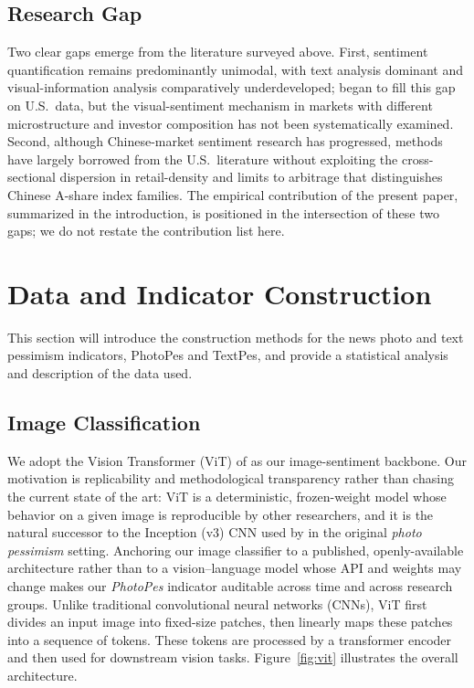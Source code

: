 \documentclass[AER]{AEA}
\begin{document}
\subsection{Research Gap}

Two clear gaps emerge from the literature surveyed above. First, sentiment quantification remains predominantly unimodal, with text analysis dominant and visual-information analysis comparatively underdeveloped; \citet{obaid2022picture} began to fill this gap on U.S.\ data, but the visual-sentiment mechanism in markets with different microstructure and investor composition has not been systematically examined. Second, although Chinese-market sentiment research has progressed, methods have largely borrowed from the U.S.\ literature without exploiting the cross-sectional dispersion in retail-density and limits to arbitrage that distinguishes Chinese A-share index families. The empirical contribution of the present paper, summarized in the introduction, is positioned in the intersection of these two gaps; we do not restate the contribution list here.



\section{Data and Indicator Construction}

This section will introduce the construction methods for the news photo and text pessimism indicators, PhotoPes and TextPes, and provide a statistical analysis and description of the data used.

\subsection{Image Classification}
We adopt the Vision Transformer (ViT) of \citet{dosovitskiy2020image} as our image-sentiment backbone. Our motivation is replicability and methodological transparency rather than chasing the current state of the art: ViT is a deterministic, frozen-weight model whose behavior on a given image is reproducible by other researchers, and it is the natural successor to the Inception (v3) CNN used by \citet{obaid2022picture} in the original \emph{photo pessimism} setting. Anchoring our image classifier to a published, openly-available architecture rather than to a vision--language model whose API and weights may change makes our \textit{PhotoPes} indicator auditable across time and across research groups. Unlike traditional convolutional neural networks (CNNs), ViT first divides an input image into fixed-size patches, then linearly maps these patches into a sequence of tokens. These tokens are processed by a transformer encoder and then used for downstream vision tasks. Figure~\ref{fig:vit} illustrates the overall architecture.
\end{document}

